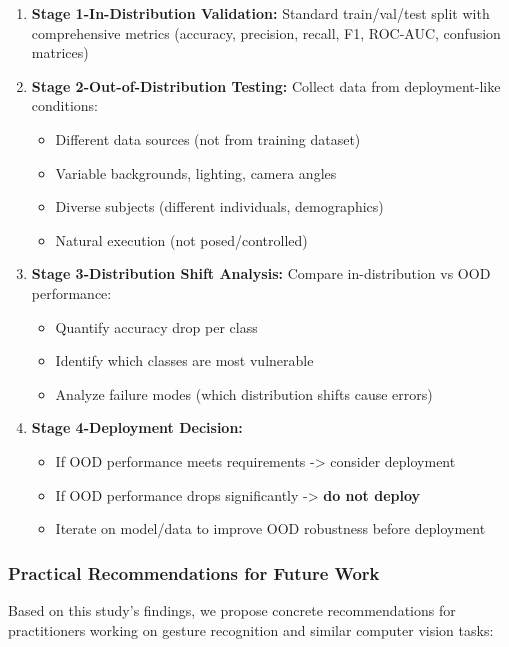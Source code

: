\documentclass[12pt,a4paper]{article}
\begin{document}
\begin{enumerate}
    \item \textbf{Stage 1-In-Distribution Validation:} Standard train/val/test split with comprehensive metrics (accuracy, precision, recall, F1, ROC-AUC, confusion matrices)
    
    \item \textbf{Stage 2-Out-of-Distribution Testing:} Collect data from deployment-like conditions:
    \begin{itemize}
        \item Different data sources (not from training dataset)
        \item Variable backgrounds, lighting, camera angles
        \item Diverse subjects (different individuals, demographics)
        \item Natural execution (not posed/controlled)
    \end{itemize}
    
    \item \textbf{Stage 3-Distribution Shift Analysis:} Compare in-distribution vs OOD performance:
    \begin{itemize}
        \item Quantify accuracy drop per class
        \item Identify which classes are most vulnerable
        \item Analyze failure modes (which distribution shifts cause errors)
    \end{itemize}
    
    \item \textbf{Stage 4-Deployment Decision:}
    \begin{itemize}
        \item If OOD performance meets requirements -> consider deployment
        \item If OOD performance drops significantly -> \textbf{do not deploy}
        \item Iterate on model/data to improve OOD robustness before deployment
    \end{itemize}
\end{enumerate}

\subsubsection{Practical Recommendations for Future Work}

Based on this study's findings, we propose concrete recommendations for practitioners working on gesture recognition and similar computer vision tasks:
\end{document}
